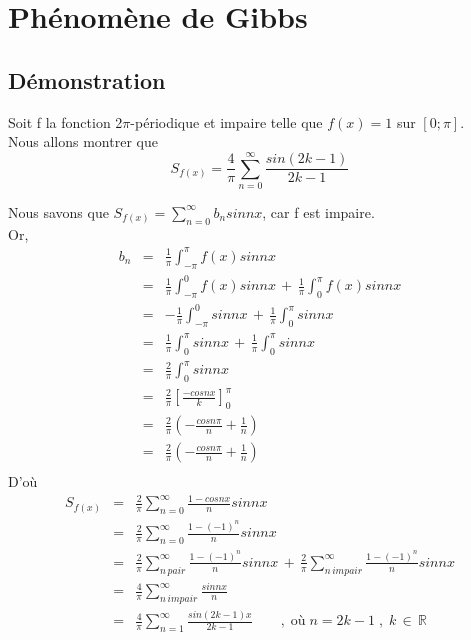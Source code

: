 \documentclass[a4paper,12pt]{report}
\begin{document}
\chapter{Phénomène de Gibbs}
\section{Démonstration}
Soit f la fonction 2$\pi$-périodique et impaire telle que $f(x) = 1$ sur $[0; \pi]$.\\

Nous allons montrer que \[S_{f(x)}=\frac{4}{\pi}\sum\limits_{n=0}^{\infty}\frac{sin(2k-1)}{2k-1}\]

Nous savons que $S_{f(x)}=\displaystyle\sum\limits_{n=0}^{\infty} b_{n}sinnx$, car f est impaire.\\
Or, \begin{eqnarray*}
b_{n}&=&\frac{1}{\pi}\int_{-\pi}^{\pi}f(x)sinnx\\
		 &=&\frac{1}{\pi}\int_{-\pi}^{0}f(x)sinnx\,+\,\frac{1}{\pi}\int_{0}^{\pi}f(x)sinnx\\
		 &=&-\frac{1}{\pi}\int_{-\pi}^{0}sinnx\,+\,\frac{1}{\pi}\int_{0}^{\pi}sinnx\\
		 &=&\frac{1}{\pi}\int_{0}^{\pi}sinnx\,+\,\frac{1}{\pi}\int_{0}^{\pi}sinnx\\
		 &=&\frac{2}{\pi}\int_{0}^{\pi}sinnx\\
		&=&\frac{2}{\pi}\left[\frac{-cosnx}{k}\right]_0^\pi\\
		 &=&\frac{2}{\pi}\left(-\frac{cosn\pi}{n}+\frac{1}{n}\right)\\
		 &=&\frac{2}{\pi}\left(-\frac{cosn\pi}{n}+\frac{1}{n}\right)\\
	\end{eqnarray*}
D'o\`u \begin{eqnarray*}
S_{f(x)}&=&\frac{2}{\pi}\displaystyle\sum\limits_{n=0}^{\infty}\frac{1-cosnx}{n}sinnx\\
		&=&\frac{2}{\pi}\displaystyle\sum\limits_{n=0}^{\infty}\frac{1-(-1)^{n}}{n}sinnx\\
		&=&\frac{2}{\pi}\sum\limits_{n\,pair}^{\infty}\frac{1-(-1)^{n}}{n}sinnx\,+\,\frac{2}{\pi}\sum\limits_{n\,impair}^{\infty}\frac{1-(-1)^{n}}{n}sinnx\\
		&=&\frac{4}{\pi}\sum\limits_{n\,impair}^{\infty}\frac{sinnx}{n}\\
		&=&\frac{4}{\pi}\sum\limits_{n=1}^{\infty}\frac{sin(2k-1)x}{2k-1}\qquad,\;\text{o\`u}\;n=2k-1\;,\;k\,\in\,\pmb{\mathbb{R}}\\
	\end{eqnarray*}
\end{document}
